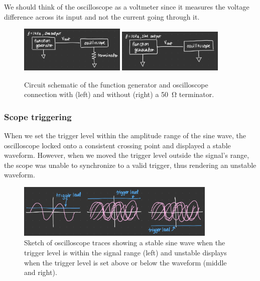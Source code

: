 \documentclass{article}
\begin{document}
\noindent We should think of the oscilloscope as a voltmeter since it measures the voltage difference across its input and not the current going through it.


\begin{figure}[H]
    \centering
    \includegraphics[width=0.45\textwidth]{circuit with terminator.png}
    \hfill
    \includegraphics[width=0.45\textwidth]{circuit without terminator.png}
    \caption{Circuit schematic of the function generator and oscilloscope connection with (left) and without (right) a \SI{50}{\ohm} terminator.}
    \label{fig:circuit_comparison}
\end{figure}


\subsubsection{Scope triggering}

When we set the trigger level within the amplitude range of the sine wave, the oscilloscope locked onto a consistent crossing point and displayed a stable waveform. However, when we moved the trigger level outside the signal's range, the scope was unable to synchronize to a valid trigger, thus rendering an unstable waveform.

\begin{figure}[H]
    \centering
    \includegraphics[width=0.85\textwidth]{trigger level sketch.jpeg}
    \caption{Sketch of oscilloscope traces showing a stable sine wave when the trigger level is within the signal range (left) and unstable displays when the trigger level is set above or below the waveform (middle and right).}
    \label{fig:my_label}
\end{figure}
\end{document}

